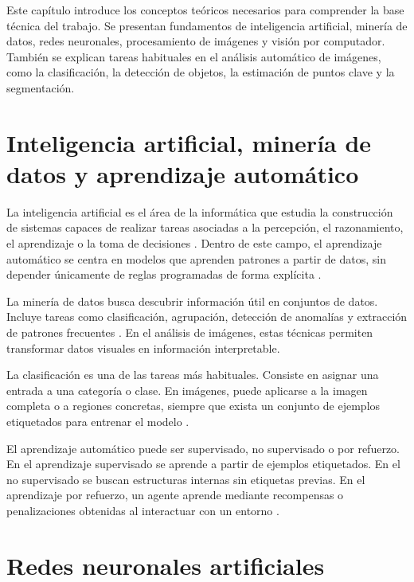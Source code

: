 
Este capítulo introduce los conceptos teóricos necesarios para comprender la base técnica del trabajo. Se presentan fundamentos de inteligencia artificial, minería de datos, redes neuronales, procesamiento de imágenes y visión por computador. También se explican tareas habituales en el análisis automático de imágenes, como la clasificación, la detección de objetos, la estimación de puntos clave y la segmentación.

\section{Inteligencia artificial, minería de datos y aprendizaje automático}

La inteligencia artificial es el área de la informática que estudia la construcción de sistemas capaces de realizar tareas asociadas a la percepción, el razonamiento, el aprendizaje o la toma de decisiones \cite{russell2021artificial}. Dentro de este campo, el aprendizaje automático se centra en modelos que aprenden patrones a partir de datos, sin depender únicamente de reglas programadas de forma explícita \cite{bishop2006pattern}.

La minería de datos busca descubrir información útil en conjuntos de datos. Incluye tareas como clasificación, agrupación, detección de anomalías y extracción de patrones frecuentes \cite{han2011data}. En el análisis de imágenes, estas técnicas permiten transformar datos visuales en información interpretable.

La clasificación es una de las tareas más habituales. Consiste en asignar una entrada a una categoría o clase. En imágenes, puede aplicarse a la imagen completa o a regiones concretas, siempre que exista un conjunto de ejemplos etiquetados para entrenar el modelo \cite{witten2016data}.

El aprendizaje automático puede ser supervisado, no supervisado o por refuerzo. En el aprendizaje supervisado se aprende a partir de ejemplos etiquetados. En el no supervisado se buscan estructuras internas sin etiquetas previas. En el aprendizaje por refuerzo, un agente aprende mediante recompensas o penalizaciones obtenidas al interactuar con un entorno \cite{russell2021artificial}.

\section{Redes neuronales artificiales}

